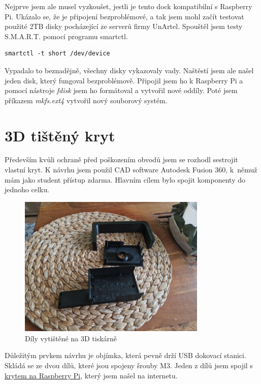 \documentclass[a4paper,12pt, oneside]{book}
\begin{document}
Nejprve jsem ale musel vyzkoušet, jestli je tento dock kompatibilní 
s Raspberry Pi. Ukázalo se, že je připojení bezproblémové, a tak
jsem mohl začít testovat použité 2TB disky pocházející ze serverů
firmy UnArtel. Spouštěl jsem testy S.M.A.R.T. pomocí programu smartctl.

\begin{lstlisting}
smartctl -t short /dev/device
\end{lstlisting} 

Vypadalo to beznadějně, všechny disky vykazovaly vady. 
Naštěstí jsem ale našel jeden disk, který fungoval bezproblémově.
Připojil jsem ho k Raspberry Pi a pomocí nástroje
\emph{fdisk} jsem ho formátoval a vytvořil nové oddíly.
Poté jsem příkazem \emph{mkfs.ext4} vytvořil nový souborový systém.




\section{3D tištěný kryt}

Především kvůli ochraně před poškozením obvodů jsem se rozhodl 
sestrojit vlastní kryt. K návrhu jsem použil CAD software 
Autodesk Fusion 360, k němuž mám jako student přístup zdarma.
Hlavním cílem bylo spojit komponenty do jednoho celku.


\begin{figure}[h]
\centering
\includegraphics[width=0.8\textwidth]{img/dily-zvlast.jpg}
\caption{Díly vytištěné na 3D tiskárně}
\end{figure}

Důležitým prvkem návrhu je objímka, která pevně drží USB dokovací stanici.
Skládá se ze dvou dílů, které jsou spojeny šrouby M3. Jeden z dílů jsem
spojil s
\href{https://www.printables.com/model/705427-retro-raspberry-pi-5-case-snap-fit}{krytem
na Raspberry Pi}, který jsem našel na internetu.
\end{document}
